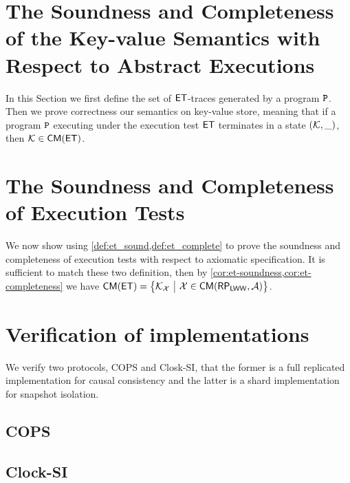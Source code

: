 \documentclass[conference,compsoc]{IEEEtran}
\newcommand{\RootPath}{.}
\begin{document}
\section{The Soundness and Completeness of the Key-value Semantics with Respect to Abstract Executions}
\label{sec:kv-sound-complete-proof}

In this Section we first define the set of $\mathsf{ET}$-traces generated by a program $\mathtt{P}$. 
Then we prove correctness our semantics on key-value store,
meaning that if a program $\mathtt{P}$ executing under the execution 
test $\mathsf{ET}$ terminates in a state $(\mathcal{K}, \_)$, then $\mathcal{K} \in \mathsf{CM}(\mathsf{ET})$. 





\section{The Soundness and Completeness of Execution Tests}
\label{app:et_sound_complete}
We now show using \cref{def:et_sound,def:et_complete} to prove the soundness and completeness of execution tests with respect to axiomatic specification.
It is sufficient to match these two definition, 
then by \cref{cor:et-soundness,cor:et-completeness} we have \( \CMs(\ET) = \Setcon{\mkvs_\aexec}{\aexec \in \CMa(\RP_\LWW,\Ax)} \).

\label{sec:kv-sound-complete-proof}
\label{sec:spec-proof}











\section{Verification of implementations}

We verify two protocols, COPS and Closk-SI, that the former is a full replicated implementation for causal consistency and the latter is a shard implementation for snapshot isolation.

\subsection{COPS}
\label{sec:cops}


\subsection{Clock-SI}
\label{sec:clock-si}


\end{document}
